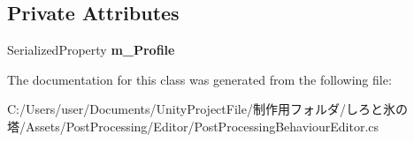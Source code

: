 \subsection*{Private Attributes}
\begin{DoxyCompactItemize}
\item 
\mbox{\label{class_unity_editor_1_1_post_processing_1_1_post_processing_behaviour_editor_a1a5ae04734974541384b554eadc97536}} 
Serialized\+Property {\bfseries m\+\_\+\+Profile}
\end{DoxyCompactItemize}


The documentation for this class was generated from the following file\+:\begin{DoxyCompactItemize}
\item 
C\+:/\+Users/user/\+Documents/\+Unity\+Project\+File/制作用フォルダ/しろと氷の塔/\+Assets/\+Post\+Processing/\+Editor/Post\+Processing\+Behaviour\+Editor.\+cs\end{DoxyCompactItemize}

